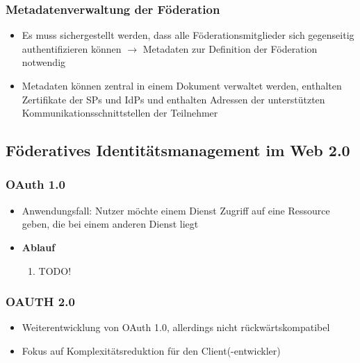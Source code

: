 \subsubsection{Metadatenverwaltung der Föderation}
\begin{itemize}
	\item Es muss sichergestellt werden, dass alle Föderationsmitglieder sich gegenseitig authentifizieren können $\rightarrow$ Metadaten zur Definition der Föderation notwendig
	\item Metadaten können zentral in einem Dokument verwaltet werden, enthalten Zertifikate der SPs und IdPs und enthalten Adressen der unterstützten Kommunikationsschnittstellen der Teilnehmer
\end{itemize}


\subsection{Föderatives Identitätsmanagement im Web 2.0}

\subsubsection{OAuth 1.0}
\begin{itemize}
	\item Anwendungsfall: Nutzer möchte einem Dienst Zugriff auf eine Ressource geben, die bei einem anderen Dienst liegt
	\item \textbf{Ablauf}
	\begin{enumerate}
		\item TODO!
	\end{enumerate}
\end{itemize}

\subsubsection{OAUTH 2.0}
\begin{itemize}
	\item Weiterentwicklung von OAuth 1.0, allerdings nicht rückwärtskompatibel
	\item Fokus auf Komplexitätsreduktion für den Client(-entwickler)
\end{itemize}

